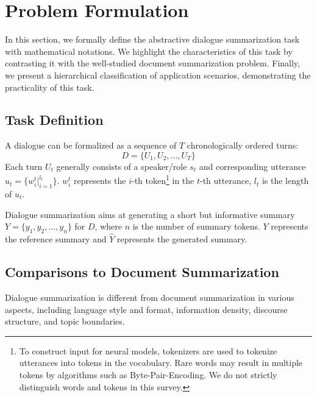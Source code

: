 \section{Problem Formulation}
\label{sec:task}

In this section, we formally define the abstractive dialogue summarization
task with mathematical notations. We highlight the characteristics of this task by contrasting it with the well-studied document summarization
problem. Finally, we present a hierarchical classification of application scenarios, demonstrating the practicality of this task.

\subsection{Task Definition}\label{sec:taskdefinition}
A dialogue can be formalized as a sequence of $T$ chronologically ordered turns:
\begin{equation}
	D = \{U_1, U_2, ..., U_T\}
	\label{eq:dialogue}
\end{equation}
Each turn $U_t$ generally consists of a speaker/role $s_t$ and corresponding utterance $u_t = \{w_i^t|_{i=1}^{l_t}\}$. $w_i^t$ represents the $i$-th token\footnote{To construct input for neural models, tokenizers are used to tokenize utterances into tokens in the vocabulary. Rare words may result in multiple tokens by algorithms such as Byte-Pair-Encoding. We do not strictly distinguish words and tokens in this survey.} in the $t$-th utterance, $l_t$ is the length of $u_t$.

Dialogue summarization aims at generating a short but informative 
summary $Y=\{y_1,y_2,...,y_n\}$ for $D$, where $n$ is 
the number of summary tokens. $Y$ represents the reference summary 
and $\hat{Y}$ represents the generated summary.



\subsection{Comparisons to Document Summarization}\label{sec:divergence}

Dialogue summarization is different from document summarization in various 
aspects, including language style and format, information density, 
discourse structure, and topic boundaries.

